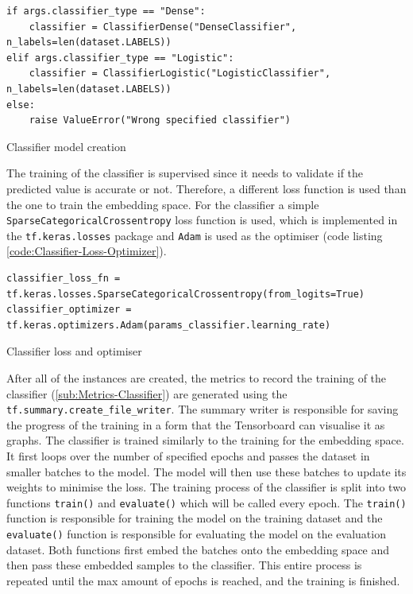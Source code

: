\begin{code}[H]
\begin{verbatim}
if args.classifier_type == "Dense":
    classifier = ClassifierDense("DenseClassifier", n_labels=len(dataset.LABELS))
elif args.classifier_type == "Logistic":
    classifier = ClassifierLogistic("LogisticClassifier", n_labels=len(dataset.LABELS))
else:
    raise ValueError("Wrong specified classifier")
\end{verbatim}
\caption{Classifier model creation}
\label{code:Classifier-Model-Creation}
\end{code}
\noindent
The training of the classifier is supervised since it needs to validate if the predicted value is accurate or not. Therefore, a different loss function is used than the one to train the embedding space. For the classifier a simple \texttt{SparseCategoricalCrossentropy} loss function is used, which is implemented in the \texttt{tf.keras.losses} package and \texttt{Adam} is used as the optimiser (code listing \ref{code:Classifier-Loss-Optimizer}).

\begin{code}[H]
\begin{verbatim}
classifier_loss_fn = tf.keras.losses.SparseCategoricalCrossentropy(from_logits=True)
classifier_optimizer = tf.keras.optimizers.Adam(params_classifier.learning_rate)
\end{verbatim}
\caption{Classifier loss and optimiser}
\label{code:Classifier-Loss-Optimizer}
\end{code}
\noindent
After all of the instances are created, the metrics to record the training of the classifier (\ref{sub:Metrics-Classifier}) are generated using the \texttt{tf.summary.create\_file\_writer}. The summary writer is responsible for saving the progress of the training in a form that the Tensorboard can visualise it as graphs. 
\newline
\newline
The classifier is trained similarly to the training for the embedding space. It first loops over the number of specified epochs and passes the dataset in smaller batches to the model. The model will then use these batches to update its weights to minimise the loss. The training process of the classifier is split into two functions \texttt{train()} and \texttt{evaluate()} which will be called every epoch. The \texttt{train()} function is responsible for training the model on the training dataset and the \texttt{evaluate()} function is responsible for evaluating the model on the evaluation dataset. Both functions first embed the batches onto the embedding space and then pass these embedded samples to the classifier. This entire process is repeated until the max amount of epochs is reached, and the training is finished.

